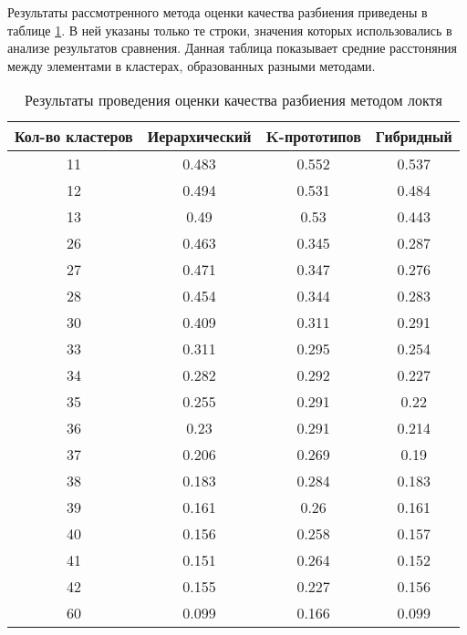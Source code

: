Результаты рассмотренного метода оценки качества разбиения приведены в таблице \ref{tbl:test_elbow}. В ней указаны только те строки, значения которых использовались в анализе результатов сравнения. Данная таблица показывает средние расстоняния между элементами в кластерах, образованных разными методами.
\begin{table}[H]
    \centering
	\caption{Результаты проведения оценки качества разбиения методом локтя}
    \label{tbl:test_elbow}
	\begin{tabular}{|c|c|c|c|}
        \hline
        \textbf{Кол-во кластеров} & \textbf{Иерархический} & \textbf{K-прототипов} & \textbf{Гибридный} \\ \hline
        11     &     0.483     &    0.552     &   0.537  \\ \hline
        12     &     0.494     &    0.531     &   0.484  \\ \hline
        13     &      0.49     &     0.53     &   0.443  \\ \hline
        26     &     0.463     &    0.345     &   0.287  \\ \hline
        27     &     0.471     &    0.347     &   0.276  \\ \hline
        28     &     0.454     &    0.344     &   0.283  \\ \hline
        30     &     0.409     &    0.311     &   0.291  \\ \hline
        33     &     0.311     &    0.295     &   0.254  \\ \hline
        34     &     0.282     &    0.292     &   0.227  \\ \hline
        35     &     0.255     &    0.291     &    0.22  \\ \hline
        36     &      0.23     &    0.291     &   0.214  \\ \hline
        37     &     0.206     &    0.269     &    0.19  \\ \hline
        38     &     0.183     &    0.284     &   0.183  \\ \hline
        39     &     0.161     &     0.26     &   0.161  \\ \hline
        40     &     0.156     &    0.258     &   0.157  \\ \hline
        41     &     0.151     &    0.264     &   0.152  \\ \hline
        42     &     0.155     &    0.227     &   0.156  \\ \hline
        60     &     0.099     &    0.166     &   0.099  \\ \hline
    \end{tabular}
\end{table}

